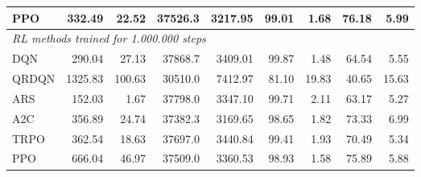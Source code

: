 \begin{samepage}
\begin{center}
\begin{tabular}{l|rr|rr|rr|rr}
    PPO          &   332.49 &    22.52 &    37526.3 &    3217.95 &   99.01 &    1.68 &   76.18 &    5.99 \\
    \midrule
    \multicolumn{9}{l}{\textit{RL methods trained for 1.000.000 steps}} \\
    \midrule
    DQN          &   290.04 &    27.13 &    37868.7 &    3409.01 &   99.87 &    1.48 &   64.54 &    5.55 \\
    QRDQN        &  1325.83 &   100.63 &    30510.0 &    7412.97 &   81.10 &   19.83 &   40.65 &   15.63 \\
    ARS          &   152.03 &     1.67 &    37798.0 &    3347.10 &   99.71 &    2.11 &   63.17 &    5.27 \\
    A2C          &   356.89 &    24.74 &    37382.3 &    3169.65 &   98.65 &    1.82 &   73.33 &    6.99 \\
    TRPO         &   362.54 &    18.63 &    37697.0 &    3440.84 &   99.41 &    1.93 &   70.49 &    5.34 \\
    PPO          &   666.04 &    46.97 &    37509.0 &    3360.53 &   98.93 &    1.58 &   75.89 &    5.88 \\
    \bottomrule
  \end{tabular}
\end{center}
\end{samepage}

